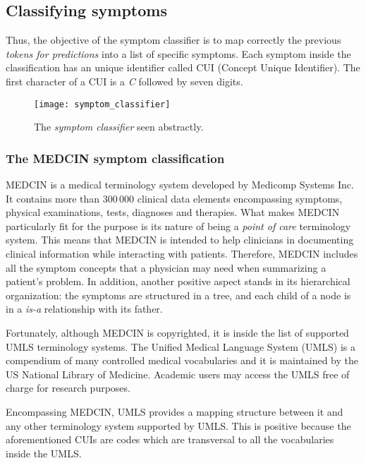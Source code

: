 \subsection{Classifying symptoms}
\label{sec:cla_symp}

Thus, the objective of the symptom classifier is to map correctly the previous \textit{tokens for predictions} into a list of specific symptoms. Each symptom inside the classification has an unique identifier called CUI (Concept Unique Identifier). The first character of a CUI is a \textit{C} followed by seven digits.

\begin{figure}[h]
\centering
\texttt{[image: symptom\_classifier]}
\caption{The \textit{symptom classifier} seen abstractly.}
\medskip
\end{figure}

\subsubsection{The MEDCIN symptom classification}
MEDCIN is a medical terminology system developed by Medicomp Systems Inc. It contains more than $300\,000$ clinical data elements encompassing symptoms, physical examinations, tests, diagnoses and therapies. What makes MEDCIN particularly fit for the purpose is its nature of being a \textit{point of care} terminology system. This means that MEDCIN is intended to help clinicians in documenting clinical information while interacting with patients. Therefore, MEDCIN includes all the symptom concepts that a physician may need when summarizing a patient's problem. In addition, another positive aspect stands in its hierarchical organization: the symptoms are structured in a tree, and each child of a node is in a \textit{is-a} relationship with its father.

Fortunately, although MEDCIN is copyrighted, it is inside the list of supported UMLS terminology systems. The Unified Medical Language System (UMLS) is a compendium of many controlled medical vocabularies and it is maintained by the US National Library of Medicine. Academic users may access the UMLS free of charge for research purposes.

Encompassing MEDCIN, UMLS provides a mapping structure between it and any other terminology system supported by UMLS. This is positive because the aforementioned CUIs are codes which are transversal to all the vocabularies inside the UMLS.

